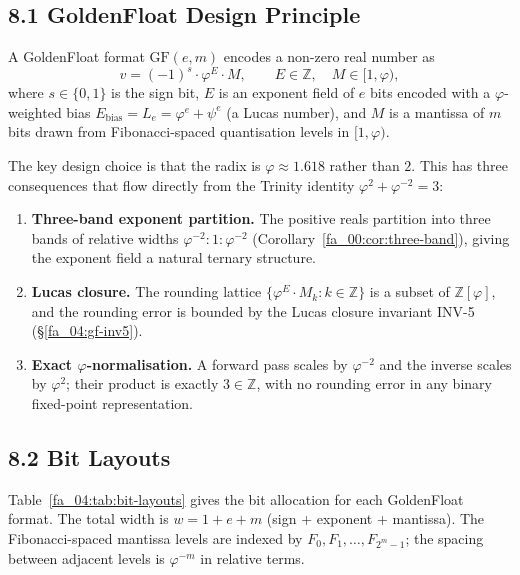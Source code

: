 \subsection{8.1 GoldenFloat Design Principle}\label{fa_04:gf-design-principle}

\begin{definition}
\label{fa_04:def:gf-format}
A GoldenFloat format \(\mathrm{GF}(e,m)\) encodes a non-zero real number as
\[
  v = (-1)^{s} \cdot \varphi^{E} \cdot M, \qquad E \in \mathbb{Z},\quad M \in [1, \varphi),
\]
where \(s \in \{0,1\}\) is the sign bit, \(E\) is an exponent field of \(e\)
bits encoded with a \(\varphi\)-weighted bias
\(E_{\text{bias}} = L_{e} = \varphi^{e} + \psi^{e}\) (a Lucas number),
and \(M\) is a mantissa of \(m\) bits drawn from Fibonacci-spaced
quantisation levels in \([1,\varphi)\).
\end{definition}

The key design choice is that the radix is \(\varphi \approx 1.618\) rather
than \(2\). This has three consequences that flow directly from the
Trinity identity \(\varphi^2 + \varphi^{-2} = 3\):

\begin{enumerate}
  \item \textbf{Three-band exponent partition.} The positive reals partition
        into three bands of relative widths \(\varphi^{-2} : 1 : \varphi^{-2}\)
        (Corollary~\ref{fa_00:cor:three-band}), giving the exponent field a
        natural ternary structure.
  \item \textbf{Lucas closure.} The rounding lattice
        \(\{ \varphi^{E} \cdot M_k : k \in \mathbb{Z} \}\) is a subset of
        \(\mathbb{Z}[\varphi]\), and the rounding error is bounded by the
        Lucas closure invariant INV-5
        (\S\ref{fa_04:gf-inv5}).
  \item \textbf{Exact \(\varphi\)-normalisation.} A forward pass scales by
        \(\varphi^{-2}\) and the inverse scales by \(\varphi^2\); their product
        is exactly \(3 \in \mathbb{Z}\), with no rounding error in any binary
        fixed-point representation.
\end{enumerate}

\subsection{8.2 Bit Layouts}\label{fa_04:gf-bit-layouts}

Table~\ref{fa_04:tab:bit-layouts} gives the bit allocation for each
GoldenFloat format. The total width is \(w = 1 + e + m\) (sign + exponent +
mantissa). The Fibonacci-spaced mantissa levels are indexed by
\(F_0, F_1, \ldots, F_{2^m - 1}\); the spacing between adjacent levels is
\(\varphi^{-m}\) in relative terms.


